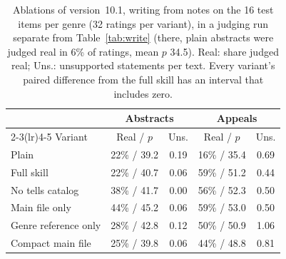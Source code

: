 \documentclass[11pt]{article}
\begin{document}
\begin{table}[t]
\centering\small
\setlength{\tabcolsep}{3pt}
\begin{tabular}{lcccc}
\toprule
 & \multicolumn{2}{c}{Abstracts} & \multicolumn{2}{c}{Appeals} \\
\cmidrule(lr){2-3}\cmidrule(lr){4-5}
Variant & Real / $p$ & Uns. & Real / $p$ & Uns. \\
\midrule
Plain & 22\% / 39.2 & 0.19 & 16\% / 35.4 & 0.69 \\
Full skill & 22\% / 40.7 & 0.06 & 59\% / 51.2 & 0.44 \\
No tells catalog & 38\% / 41.7 & 0.00 & 56\% / 52.3 & 0.50 \\
Main file only & 44\% / 45.2 & 0.06 & 59\% / 53.0 & 0.50 \\
Genre reference only & 28\% / 42.8 & 0.12 & 50\% / 50.9 & 1.06 \\
Compact main file & 25\% / 39.8 & 0.06 & 44\% / 48.8 & 0.81 \\
\bottomrule
\end{tabular}
\caption{Ablations of version~10.1, writing from notes on the 16 test items per genre (32 ratings per variant), in a judging run separate from Table~\ref{tab:write} (there, plain abstracts were judged real in 6\% of ratings, mean $p$ 34.5). Real: share judged real; Uns.: unsupported statements per text. Every variant's paired difference from the full skill has an interval that includes zero.}
\label{tab:ablation}
\end{table}
\end{document}
